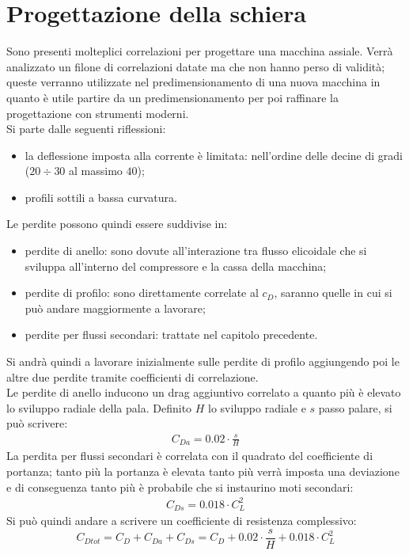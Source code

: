\section{Progettazione della schiera}
Sono presenti molteplici correlazioni per progettare una macchina assiale. Verrà analizzato un filone di correlazioni datate ma che non hanno perso di validità; queste verranno utilizzate nel predimensionamento di una nuova macchina in quanto è utile partire da un predimensionamento per poi raffinare la progettazione con strumenti moderni.\\
Si parte dalle seguenti riflessioni:
\begin{itemize}
\item la deflessione imposta alla corrente è limitata: nell'ordine delle decine di gradi ($20 \div 30$ al massimo $40$);
\item profili sottili a bassa curvatura.
\end{itemize}
Le perdite possono quindi essere suddivise in:
\begin{itemize}
\item perdite di anello: sono dovute all'interazione tra flusso elicoidale che si sviluppa all'interno del compressore e la cassa della macchina;
\item perdite di profilo: sono direttamente correlate al $c_D$, saranno quelle in cui si può andare maggiormente a lavorare;
\item perdite per flussi secondari: trattate nel capitolo precedente.
\end{itemize}
Si andrà quindi a lavorare inizialmente sulle perdite di profilo aggiungendo poi le altre due perdite tramite coefficienti di correlazione.\\
Le perdite di anello inducono un drag aggiuntivo correlato a quanto più è elevato lo sviluppo radiale della pala. Definito $H$ lo sviluppo radiale e $s$ passo palare, si può scrivere:
\begin{align*}
C_{Da} = 0.02 \cdot \frac{s}{H}
\end{align*}
La perdita per flussi secondari è correlata con il quadrato del coefficiente di portanza; tanto più la portanza è elevata tanto più verrà imposta una deviazione e di conseguenza tanto più è probabile che si instaurino moti secondari:
\begin{align*}
C_{Ds} = 0.018 \cdot C_L^2
\end{align*}
Si può quindi andare a scrivere un coefficiente di resistenza complessivo:
\begin{equation}
C_{Dtot} = C_D + C_{Da} + C_{Ds} = C_D + 0.02 \cdot \frac{s}{H} + 0.018 \cdot C_L^2
\label{eq:Cdtot}
\end{equation}
